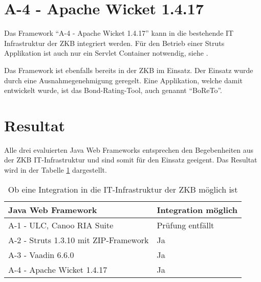 \section{A-4 - Apache Wicket 1.4.17}

Das Framework ``A-4 - Apache Wicket 1.4.17'' kann in die bestehende IT
Infrastruktur der \ac{ZKB} integriert werden. Für den Betrieb einer Struts
Applikation ist auch nur ein Servlet Container notwendig, siehe
\cite{WicketDokumentation}.

Das Framework ist ebenfalls bereits in der \ac{ZKB} im Einsatz. Der Einsatz
wurde durch eine Ausnahmegenehmigung geregelt. Eine Applikation, welche damit
entwickelt wurde, ist das Bond-Rating-Tool, auch genannt ``BoReTo''.

\section{Resultat}

Alle drei evaluierten Java Web Frameworks entsprechen den Begebenheiten aus der
\ac{ZKB} IT-Infrastruktur und sind somit für den Einsatz geeigent. Das Resultat
wird in der Tabelle \ref{tab:integrationMoeglich} dargestellt.
\newline

\begin{table}[!h]
  \sffamily 
  \begin{center}
    \begin{tabular}{ll}
      \toprule
      \textbf{Java Web Framework} & \textbf{Integration möglich}\\
      \midrule
      A-1 - ULC, Canoo RIA Suite & Prüfung entfällt\\
      A-2 - Struts 1.3.10 mit ZIP-Framework & Ja\\
      A-3 - Vaadin 6.6.0 & Ja\\
      A-4 - Apache Wicket 1.4.17 & Ja\\
      \bottomrule
    \end{tabular}
    \caption{Ob eine Integration in die IT-Infrastruktur der \ac{ZKB} möglich
    ist}
    \label{tab:integrationMoeglich}
  \end{center}
\end{table}